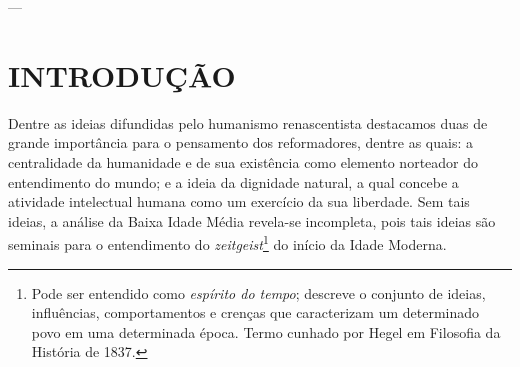 \documentclass[
    article,            %
	12pt,				%
	oneside,			%
	a4paper,			%
	chapter=TITLE,		%
	section=TITLE,		%
	english,			%
	french,				%
	spanish,			%
	brazil				%
	]{abntex2}
\begin{document}



\imprimircapa

\imprimirfolhaderosto

---
\tableofcontents*
\cleardoublepage

\textual
\pagestyle{simple}



\section{INTRODUÇÃO}

Dentre as ideias difundidas pelo humanismo renascentista destacamos duas de grande importância para o pensamento dos reformadores, dentre as quais: a centralidade da humanidade e de sua existência como elemento norteador do entendimento do mundo; e a ideia da dignidade natural, a qual concebe a atividade intelectual humana como um exercício da sua liberdade. Sem tais ideias, a análise da Baixa Idade Média revela-se incompleta, pois tais ideias são seminais para o entendimento do \emph{zeitgeist}\footnote{Pode ser entendido como \emph{espírito do tempo}; descreve o conjunto de ideias, influências, comportamentos e crenças que caracterizam um determinado povo em uma determinada época. Termo cunhado por Hegel em Filosofia da História de 1837.} do início da Idade Moderna.
\end{document}

